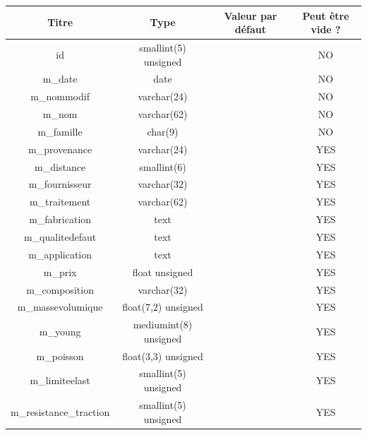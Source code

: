 \documentclass[12pt,a4paper]{article}
\begin{document}
    \begin{table}
        \begin{center}
            \footnotesize
            \begin{tabular}{|c|c|c|c|}
                \hline
                Titre & Type & Valeur par défaut & Peut être vide ? \\
                \hline
                id & smallint(5) unsigned &  & NO \\
                \hline
                m\_date & date &  & NO \\
                \hline
                m\_nommodif & varchar(24) &  & NO \\
                \hline
                m\_nom & varchar(62) &  & NO \\
                \hline
                m\_famille & char(9) &  & NO \\
                \hline
                m\_provenance & varchar(24) &  & YES \\
                \hline
                m\_distance & smallint(6) &  & YES \\
                \hline
                m\_fournisseur & varchar(32) &  & YES \\
                \hline
                m\_traitement & varchar(62) &  & YES \\
                \hline
                m\_fabrication & text &  & YES \\
                \hline
                m\_qualitedefaut & text &  & YES \\ 
                \hline
                m\_application & text &  & YES \\
                \hline
                m\_prix & float unsigned &  & YES \\
                \hline
                m\_composition & varchar(32) &  & YES \\
                \hline
                m\_massevolumique & float(7,2) unsigned &  & YES \\
                \hline
                m\_young & mediumint(8) unsigned &  & YES \\
                \hline
                m\_poisson & float(3,3) unsigned &  & YES \\
                \hline
                m\_limiteelast & smallint(5) unsigned &  & YES \\
                \hline
                m\_resistance\_traction & smallint(5) unsigned &  & YES \\

\end{tabular}
\end{center}
\end{table}
\end{document}
